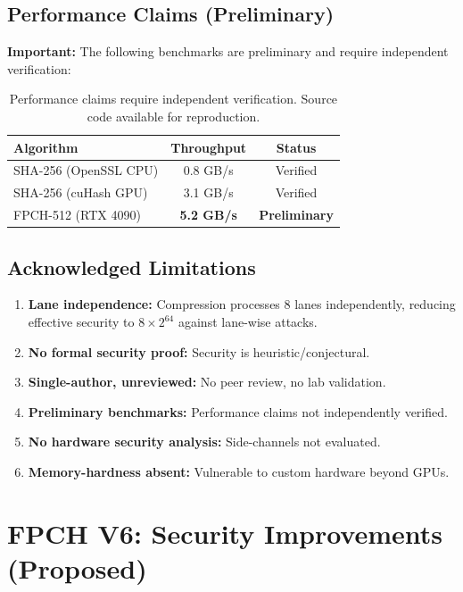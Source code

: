 \documentclass[11pt,a4paper]{article}
\theoremstyle{plain}
\theoremstyle{definition}
\theoremstyle{remark}
\begin{document}
\subsection{Performance Claims (Preliminary)}

\textbf{Important:} The following benchmarks are preliminary and require independent verification:

\begin{table}[h]
\centering
\begin{tabular}{lcc}
\toprule
Algorithm & Throughput & Status \\
\midrule
SHA-256 (OpenSSL CPU) & 0.8 GB/s & Verified \\
SHA-256 (cuHash GPU) & 3.1 GB/s & Verified \\
FPCH-512 (RTX 4090) & \textbf{5.2 GB/s} & \textbf{Preliminary} \\
\bottomrule
\end{tabular}
\caption{Performance claims require independent verification. Source code available for reproduction.}
\label{tab:perf}
\end{table}

\subsection{Acknowledged Limitations}

\begin{enumerate}
    \item \textbf{Lane independence:} Compression processes 8 lanes independently, reducing effective security to $8 \times 2^{64}$ against lane-wise attacks.
    \item \textbf{No formal security proof:} Security is heuristic/conjectural.
    \item \textbf{Single-author, unreviewed:} No peer review, no lab validation.
    \item \textbf{Preliminary benchmarks:} Performance claims not independently verified.
    \item \textbf{No hardware security analysis:} Side-channels not evaluated.
    \item \textbf{Memory-hardness absent:} Vulnerable to custom hardware beyond GPUs.
\end{enumerate}

\section{FPCH V6: Security Improvements (Proposed)}
\end{document}
